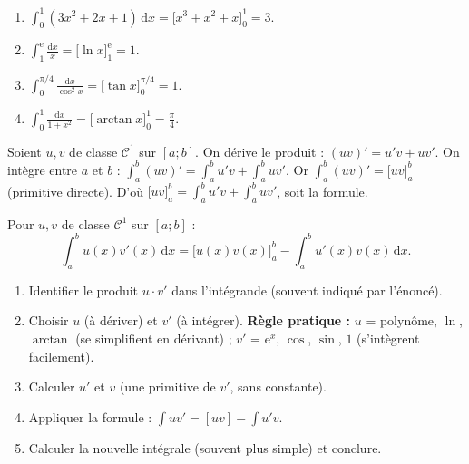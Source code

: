 \documentclass[11pt]{article}
\begin{document}
\begin{exemplebox}
\begin{enumerate}
  \item $\int_0^1 (3x^2+2x+1)\,\mathrm{d}x = \big[x^3+x^2+x\big]_0^1 = 3$.
  \item $\int_1^{\mathrm{e}} \frac{\mathrm{d}x}{x} = \big[\ln x\big]_1^{\mathrm{e}} = 1$.
  \item $\int_0^{\pi/4} \frac{\mathrm{d}x}{\cos^2 x} = \big[\tan x\big]_0^{\pi/4} = 1$.
  \item $\int_0^1 \frac{\mathrm{d}x}{1+x^2} = \big[\arctan x\big]_0^1 = \frac{\pi}{4}$.
\end{enumerate}
\end{exemplebox}

\begin{experience}
Soient $u,v$ de classe $\mathcal{C}^1$ sur $[a;b]$. On dérive le produit : $(uv)' = u'v + uv'$.
On intègre entre $a$ et $b$ : $\int_a^b (uv)' = \int_a^b u'v + \int_a^b uv'$.
Or $\int_a^b (uv)' = \big[uv\big]_a^b$ (primitive directe).
D'où $\big[uv\big]_a^b = \int_a^b u'v + \int_a^b uv'$, soit la formule.
\end{experience}

\begin{propriete}
Pour $u,v$ de classe $\mathcal{C}^1$ sur $[a;b]$ :
\[
\int_a^b u(x)v'(x)\,\mathrm{d}x = \big[u(x)v(x)\big]_a^b - \int_a^b u'(x)v(x)\,\mathrm{d}x.
\]
\end{propriete}

\begin{methode}
\begin{enumerate}
  \item Identifier le produit $u \cdot v'$ dans l'intégrande (souvent indiqué par l'énoncé).
  \item Choisir $u$ (à dériver) et $v'$ (à intégrer). \textbf{Règle pratique :} $u$ = polynôme, $\ln$, $\arctan$ (se simplifient en dérivant) ; $v'$ = $\mathrm{e}^x$, $\cos$, $\sin$, $1$ (s'intègrent facilement).
  \item Calculer $u'$ et $v$ (une primitive de $v'$, sans constante).
  \item Appliquer la formule : $\int u v' = [uv] - \int u' v$.
  \item Calculer la nouvelle intégrale (souvent plus simple) et conclure.
\end{enumerate}
\end{methode}
\end{document}
